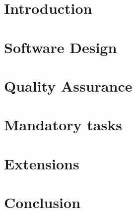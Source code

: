 

	
	\frontmatter
		
	\newpage	
	\tableofcontents 

	
	\mainmatter
	
	\chapter{Introduction}
	

	\chapter{Software Design}
	
	
	\chapter{Quality Assurance}
	
	 
	
	\chapter{Mandatory tasks}
	
	
	
	
	
	\chapter{Extensions}
	
	
	
	
	\chapter{Conclusion}
	
	
	\backmatter
	

